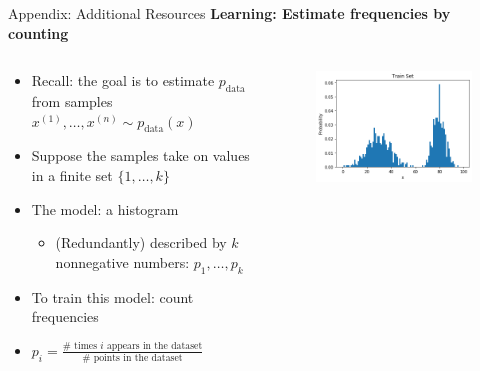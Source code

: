 \begin{frame}[allowframebreaks]{Appendix: Additional Resources}
\large
\textbf{Learning: Estimate frequencies by counting}
\normalsize
\begin{columns}
    \begin{column}{0.55\textwidth}
       \begin{itemize}
            \setlength{\itemsep}{0.75em}
            \item Recall: the goal is to estimate $p_{\text{data}}$ from samples $x^{(1)}, \ldots, x^{(n)} \sim p_{\text{data}}(x)$
            \item Suppose the samples take on values in a finite set $\{1, \ldots, k\}$
            \item The model: a histogram
            \begin{itemize}
                \item (Redundantly) described by $k$ nonnegative numbers: $p_1, \ldots, p_k$
            \end{itemize}
            \item To train this model: count frequencies
            \item $p_i = \frac{\# \text{ times } i \text{ appears in the dataset}}{\# \text{ points in the dataset}}$
        \end{itemize}
    \end{column}
    \begin{column}{0.45\textwidth}
        \begin{figure}
            \centering
            \includegraphics[width=1.1\textwidth,keepaspectratio]{images/arm/histogram_training.png}
        \end{figure}
    \end{column}
\end{columns}


\end{frame}
